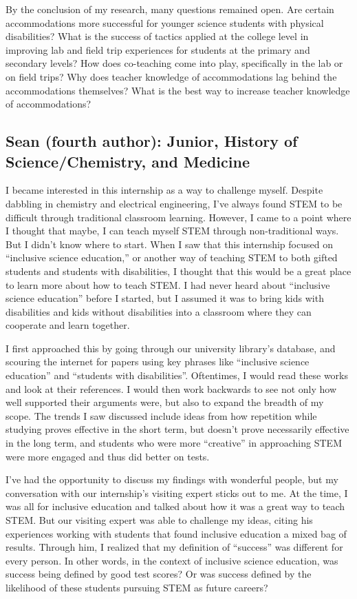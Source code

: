 \documentclass[11.5pt]{sig-alternate}
\begin{document}
\begin{large}
By the conclusion of my research, many questions remained open. Are certain accommodations more successful for younger science students with physical disabilities? What is the success of tactics applied at the college level in improving lab and field trip experiences for students at the primary and secondary levels? How does co-teaching come into play, specifically in the lab or on field trips? Why does teacher knowledge of accommodations lag behind the accommodations themselves? What is the best way to increase teacher knowledge of accommodations?

\subsection*{Sean (fourth author): Junior, History of Science/Chemistry, and Medicine}

I became interested in this internship as a way to challenge myself. Despite dabbling in chemistry and electrical engineering, I’ve always found STEM to be difficult through traditional classroom learning. However, I came to a point where I thought that maybe, I can teach myself STEM through non-traditional ways. But I didn’t know where to start. When I saw that this internship focused on “inclusive science education,” or another way of teaching STEM to both gifted students and students with disabilities, I thought that this would be a great place to learn more about how to teach STEM. I had never heard about “inclusive science education” before I started, but I assumed it was to bring kids with disabilities and kids without disabilities into a classroom where they can cooperate and learn together.

I first approached this by going through our university library’s database, and scouring the internet for papers using key phrases like “inclusive science education” and “students with disabilities”. Oftentimes, I would read these works and look at their references. I would then work backwards to see not only how well supported their arguments were, but also to expand the breadth of my scope. The trends I saw discussed include ideas from how repetition while studying proves effective in the short term, but doesn’t prove necessarily effective in the long term, and students who were more “creative” in approaching STEM were more engaged and thus did better on tests.

I’ve had the opportunity to discuss my findings with wonderful people, but my conversation with our internship’s visiting expert sticks out to me. At the time, I was all for inclusive education and talked about how it was a great way to teach STEM. But our visiting expert was able to challenge my ideas, citing his experiences working with students that found inclusive education a mixed bag of results. Through him, I realized that my definition of “success” was different for every person. In other words, in the context of inclusive science education, was success being defined by good test scores? Or was success defined by the likelihood of these students pursuing STEM as future careers?


\end{large}
\end{document}
